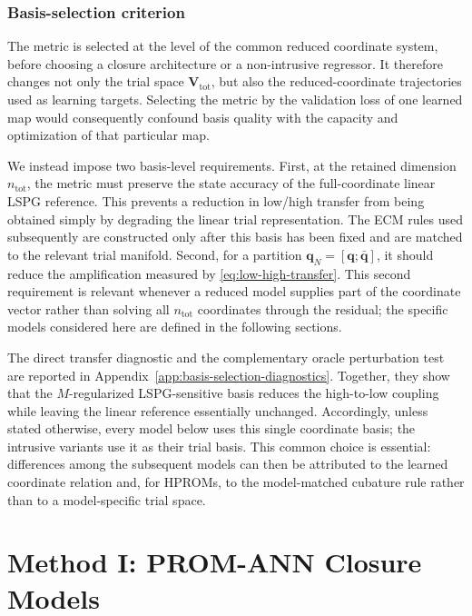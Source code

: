 \documentclass[11pt]{article}
\begin{document}
\subsubsection{Basis-selection criterion}
\label{sec:metric-selection-criterion}
The metric is selected at the level of the common reduced coordinate system,
before choosing a closure architecture or a non-intrusive regressor. It
therefore changes not only the trial space $\mathbf V_{\mathrm{tot}}$, but
also the reduced-coordinate trajectories used as learning targets. Selecting
the metric by the validation loss of one learned map would consequently
confound basis quality with the capacity and optimization of that particular
map.

We instead impose two basis-level requirements. First, at the retained
dimension $n_{\mathrm{tot}}$, the metric must preserve the state accuracy of
the full-coordinate linear LSPG reference. This prevents a reduction in
low/high transfer from being obtained simply by degrading the linear trial
representation. The ECM rules used subsequently are constructed only after
this basis has been fixed and are matched to the relevant trial manifold.
Second, for a partition
$\mathbf q_N=[\mathbf q;\bar{\mathbf q}]$, it should reduce the amplification
measured by \eqref{eq:low-high-transfer}. This second requirement is relevant
whenever a reduced model supplies part of the coordinate vector rather than
solving all $n_{\mathrm{tot}}$ coordinates through the residual; the specific
models considered here are defined in the following sections.

The direct transfer diagnostic and the complementary oracle perturbation test
are reported in Appendix~\ref{app:basis-selection-diagnostics}. Together,
they show that the $M$-regularized LSPG-sensitive basis reduces the
high-to-low coupling while leaving the linear reference essentially unchanged.
Accordingly, unless stated otherwise, every model below uses this single
coordinate basis; the intrusive variants use it as their trial basis. This
common choice is essential: differences among the subsequent models can then
be attributed to the learned coordinate relation and, for HPROMs, to the
model-matched cubature rule rather than to a model-specific trial space.

\section{Method I: PROM-ANN Closure Models}
\label{sec:method-ann}
\end{document}
